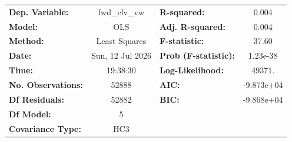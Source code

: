 \begin{tabular}{lclc}
\toprule
\textbf{Dep. Variable:}    &   fwd\_clv\_vw   & \textbf{  R-squared:         } &     0.004   \\
\textbf{Model:}            &       OLS        & \textbf{  Adj. R-squared:    } &     0.004   \\
\textbf{Method:}           &  Least Squares   & \textbf{  F-statistic:       } &     37.60   \\
\textbf{Date:}             & Sun, 12 Jul 2026 & \textbf{  Prob (F-statistic):} &  1.23e-38   \\
\textbf{Time:}             &     19:38:30     & \textbf{  Log-Likelihood:    } &    49371.   \\
\textbf{No. Observations:} &       52888      & \textbf{  AIC:               } & -9.873e+04  \\
\textbf{Df Residuals:}     &       52882      & \textbf{  BIC:               } & -9.868e+04  \\
\textbf{Df Model:}         &           5      & \textbf{                     } &             \\
\textbf{Covariance Type:}  &       HC3        & \textbf{                     } &             \\
\bottomrule
\end{tabular}
